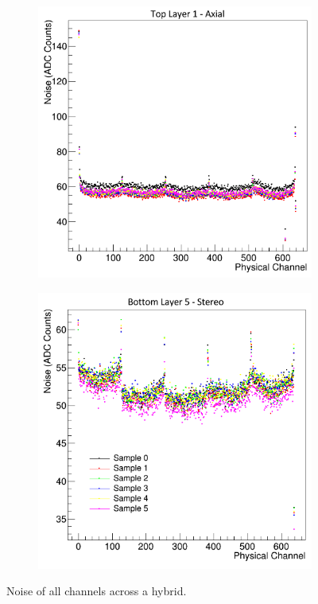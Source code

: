 \begin{figure}[h!b]
    \begin{subfigure}{.5\textwidth}
        \centering
        \includegraphics[width=\textwidth]{images/noise_top_layer1_axial.png}
    \end{subfigure}
    \begin{subfigure}{.5\textwidth}
        \centering
        \includegraphics[width=\textwidth]{images/noise_bottom_layer5_stereo.png}
    \end{subfigure}
    \caption{Noise of all channels across a hybrid.}
    \label{fig:noise}
\end{figure}  

